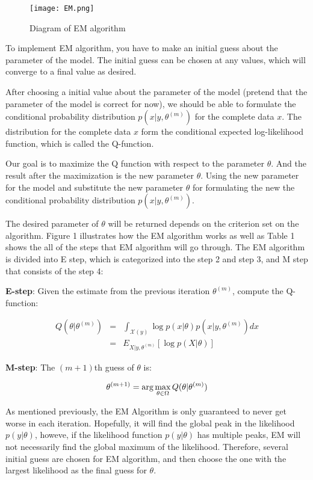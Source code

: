 \documentclass[onecolumn,12pt]{IEEEtran}
\begin{document}
\begin{figure}[htpb]
  \centering
  \texttt{[image: EM.png]}
  \caption{Diagram of EM algorithm}
\end{figure}

To implement EM algorithm, you have to make an initial guess about the parameter of the model. The initial guess can be chosen at any values, which will converge to a final value as desired.

After choosing a initial value about the parameter of the model (pretend that the parameter of the model is correct for now), we should be able to formulate the conditional probability distribution $p(x|y,\theta^{(m)})$ for the complete data $x$. The distribution for the complete data $x$ form the conditional expected log-likelihood function, which is called the Q-function.

Our goal is to maximize the Q function with respect to the parameter $\theta$. And the result after the maximization is the new parameter $\theta$. Using the new parameter for the model and substitute the new parameter $\theta$ for formulating the new the conditional probability distribution $p(x|y,\theta^{(m)})$.

The desired parameter of $\theta$ will be returned depends on the criterion set on the algorithm. Figure 1 illustrates how the EM algorithm works as well as Table 1 shows the all of the steps that EM algorithm will go through.  The EM algorithm is divided into E step, which is categorized into the step 2 and step 3, and M step that consists of the step 4:

\textbf{E-step}: Given the estimate from the previous iteration $\theta^{(m)}$, compute the Q-function:

\begin{eqnarray}
  Q(\theta|\theta^{(m)}) & = & \int_{\mathcal{X}(y)}\log p(x|\theta)p(x|y,\theta^{(m)})dx \nonumber\\
  & = & E_{X|y,\theta^{(m)}}[\log p(X|\theta)]
\end{eqnarray}

\textbf{M-step}: The $(m + 1)$th guess of $\theta$ is:

\begin{equation}
  \theta^{(m+1)} = \arg\max_{\theta\in \Omega}Q(\theta|\theta^{(m)}) \\
\end{equation}

As mentioned previously, the EM Algorithm is only guaranteed to never get worse in each iteration. Hopefully, it will find the global peak in the likelihood $p(y|\theta)$, howeve, if the likelihood function $p(y|\theta)$ has multiple peaks, EM will not necessarily find the global maximum of the likelihood. Therefore, several initial guess are chosen for EM algorithm, and then choose the one with the largest likelihood as the final guess for $\theta$. 
\end{document}
